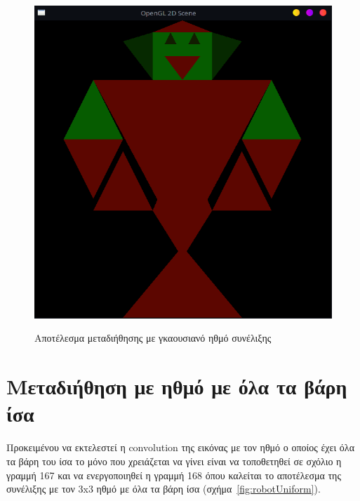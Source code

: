 \documentclass[12pt]{article}
\begin{document}
\begin{figure}[!h]
\centering
    {\includegraphics[width=1\textwidth]
    {robot_gaussian_conv.png}}
    \caption{\label{fig:robotGauss} Αποτέλεσμα μεταδιήθησης με γκαουσιανό ηθμό συνέλιξης}
\end{figure}
\clearpage

\section{Μεταδιήθηση με ηθμό με όλα τα βάρη ίσα}
Προκειμένου να εκτελεστεί η \gls{convolution} της εικόνας με τον ηθμό ο οποίος έχει όλα τα βάρη του ίσα το μόνο που χρειάζεται να γίνει είναι να τοποθετηθεί σε σχόλιο η γραμμή 167 και να ενεργοποιηθεί η γραμμή 168 όπου καλείται το αποτέλεσμα της συνέλιξης με τον 3x3 ηθμό με όλα τα βάρη ίσα (σχήμα~\ref{fig:robotUniform}).
\end{document}
